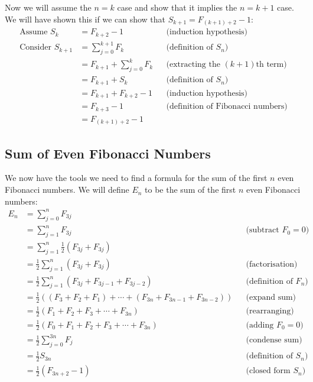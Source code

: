 \documentclass{article}
\begin{document}
Now we will assume the \(n=k\) case and show that it implies the \(n=k+1\) case.
We will have shown this if we can show that
\(S_{k+1}=F_{(k+1)+2}-1\):
\[\begin{aligned}
    \text{Assume } S_k &= F_{k+2} - 1
        && \text{(induction hypothesis)} \\
    \text{Consider } S_{k+1} &= \sum_{j=0}^{k+1} F_k
        && \text{(definition of \(S_n\))} \\
    &= F_{k+1} + \sum_{j=0}^{k} F_k
        && \text{(extracting the \((k+1)\)th term)} \\
    &= F_{k+1} + S_k
        && \text{(definition of \(S_n\))} \\
    &= F_{k+1} + F_{k+2} - 1
        && \text{(induction hypothesis)} \\
    &= F_{k+3} - 1
        && \text{(definition of Fibonacci numbers)} \\
    &= F_{(k+1)+2} - 1
\end{aligned}\]

\subsection*{Sum of Even Fibonacci Numbers}
We now have the tools we need to find a formula for the sum of the first \(n\)
even Fibonacci numbers. We will define \(E_n\) to be the sum of the first \(n\)
even Fibonacci numbers:
\[\begin{aligned}
    E_n &= \sum_{j=0}^n F_{3j} \\
    &= \sum_{j=1}^n F_{3j}
        && \text{(subtract \(F_0 = 0\))} \\
    &= \sum_{j=1}^n {\frac{1}{2}(F_{3j} + F_{3j})} \\
    &= \frac{1}{2} \sum_{j=1}^n {(F_{3j} + F_{3j})}
        && \text{(factorisation)} \\
    &= \frac{1}{2} \sum_{j=1}^n {(F_{3j} + F_{3j-1} + F_{3j-2})}
        && \text{(definition of \(F_n\))} \\
    &= \frac{1}{2} \left( (F_3 + F_2 + F_1) + \cdots
                        + (F_{3n} + F_{3n-1} + F_{3n-2}) \right)
        && \text{(expand sum)} \\
    &= \frac{1}{2} (F_1 + F_2 + F_3 + \cdots + F_{3n})
        && \text{(rearranging)} \\
    &= \frac{1}{2} (F_0 + F_1 + F_2 + F_3 + \cdots + F_{3n})
        && \text{(adding \(F_0 = 0\))} \\
    &= \frac{1}{2} \sum_{j=0}^{3n} F_j
        && \text{(condense sum)} \\
    &= \frac{1}{2} S_{3n}
        && \text{(definition of \(S_n\))} \\
    &= \frac{1}{2} (F_{3n+2} - 1)
        && \text{(closed form \(S_n\))}
\end{aligned}\]
\end{document}
